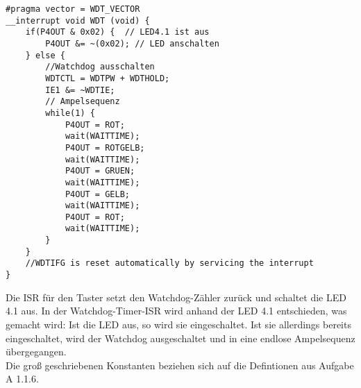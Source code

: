 \documentclass[11pt,a4paper,ngerman]{article}
\begin{document}
\begin{description}
\begin{lstlisting}
#pragma vector = WDT_VECTOR
__interrupt void WDT (void) {
	if(P4OUT & 0x02) {	// LED4.1 ist aus
		P4OUT &= ~(0x02); // LED anschalten
	} else {
		//Watchdog ausschalten
		WDTCTL = WDTPW + WDTHOLD;
		IE1 &= ~WDTIE;
		// Ampelsequenz
		while(1) {
			P4OUT = ROT;
			wait(WAITTIME);
			P4OUT = ROTGELB;
			wait(WAITTIME);
			P4OUT = GRUEN;
			wait(WAITTIME);
			P4OUT = GELB;
			wait(WAITTIME);
			P4OUT = ROT;
			wait(WAITTIME);
		}
	}
	//WDTIFG is reset automatically by servicing the interrupt
}
\end{lstlisting}
Die ISR für den Taster setzt den Watchdog-Zähler zurück und schaltet die LED 4.1 aus. In der Watchdog-Timer-ISR wird anhand der LED 4.1 entschieden, was gemacht wird: Ist die LED aus, so wird sie eingeschaltet. Ist sie allerdings bereits eingeschaltet, wird der Watchdog ausgeschaltet und in eine endlose Ampelsequenz übergegangen.\\
Die groß geschriebenen Konstanten beziehen sich auf die Defintionen aus Aufgabe A 1.1.6.
\end{description}
\end{document}
